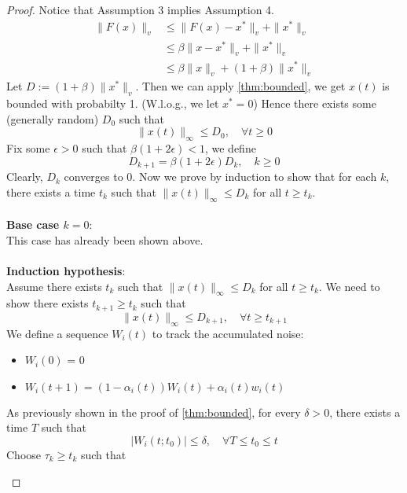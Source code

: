 \begin{proof}
   Notice that Assumption 3 implies Assumption 4.
        \begin{align*}
        \|F(x)\|_v &\le \|F(x)-x^*\|_v + \|x^*\|_v\tag{$\Delta$ ineq.}\\
        &\le \beta \|x-x^*\|_v+\|x^*\|_v\tag{Assumption 3}\\
        &\le \beta\|x\|_v + (1+\beta) \|x^*\|_v\tag{$\Delta$ ineq.}
    \end{align*}
    Let $D:= (1+\beta)\|x^*\|_v$. Then we can apply \autoref{thm:bounded}, we get $x(t)$ is bounded with probabilty 1. (W.l.o.g., we let $x^*=0$) Hence there exists some (generally random) $D_0$ such that 
    $$
    \|x(t)\|_\infty \le D_0,\quad \forall t\ge 0
    $$
    Fix some $\epsilon>0$ such that $\beta(1+2\epsilon)<1$, we define
    \begin{equation}\label{eq:Dkrecursive}
        D_{k+1} = \beta(1+2\epsilon)D_k,\quad k\ge 0
    \end{equation}
    Clearly, $D_k$ converges to $0$. Now we prove by induction to show that for each $k$, there exists a time $t_k$ such that $\|x(t)\|_\infty\le D_k$ for all $t\ge t_k$.\\
    \\
    \textbf{Base case $k=0$}:\\
    This case has already been shown above.\\
    \\
    \textbf{Induction hypothesis}:\\
    Assume there exists $t_k$ such that $\|x(t)\|_\infty \le D_k$ for all $t\ge t_k$. We need to show there exists $t_{k+1}\ge t_k$ such that 
    $$
    \|x(t)\|_\infty \le D_{k+1},\quad \forall t\ge t_{k+1}
    $$
    We define a sequence $W_i(t)$ to track the accumulated noise:
    \begin{itemize}
        \item $W_i(0)$ = 0\\
        \item $W_i(t+1) = (1-\alpha_i(t))W_i(t) + \alpha_i(t)w_i(t)$
    \end{itemize}
    As previously shown in the proof of \autoref{thm:bounded}, for every $\delta>0$, there exists a time $T$ such that
    \begin{equation}\label{eq:th3Wt}
         |W_i(t;t_0)|\le \delta,\quad \forall T\le t_0\le t
    \end{equation}
    Choose $\tau_k\ge t_k$ such that
    \begin{itemize}

\end{itemize}
\end{proof}
